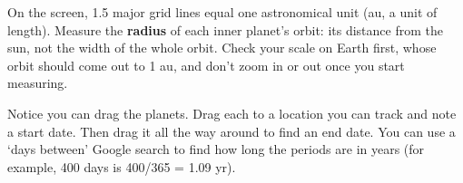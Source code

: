 \documentclass{handout}
\begin{document}
\begin{questions}
    \question On the screen, 1.5 major grid lines equal one astronomical unit (au, a unit of length). Measure the \textbf{radius} of each inner planet's orbit: its distance from the sun, not the width of the whole orbit. Check your scale on Earth first, whose orbit should come out to 1 au, and don't zoom in or out once you start measuring.

    \question Notice you can drag the planets. Drag each to a location you can track and note a start date. Then drag it all the way around to find an end date. You can use a `days between' Google search to find how long the periods are in years (for example, 400 days is 400/365 = 1.09 yr).
\end{questions}
\end{document}
